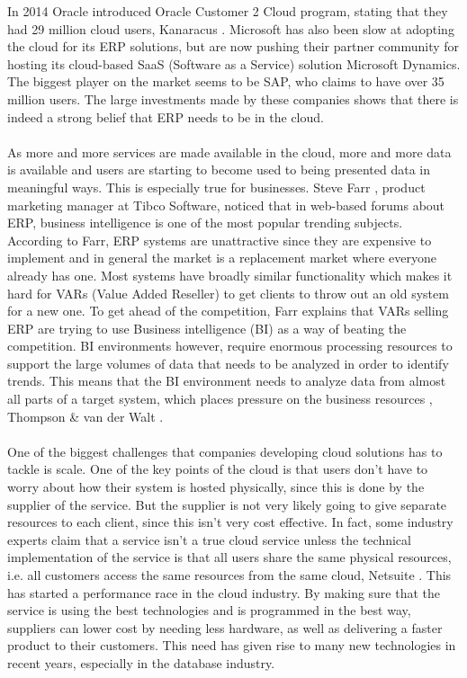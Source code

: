 \documentclass{cslthse-msc}
\begin{document}
In 2014 Oracle introduced Oracle Customer 2 Cloud program, stating that they had 29 million cloud users, Kanaracus \cite{Kanaracus2013}. Microsoft has also been slow at adopting the cloud for its ERP solutions, but are now pushing their partner community for hosting its cloud-based SaaS (Software as a Service) solution Microsoft Dynamics. The biggest player on the market seems to be SAP, who claims to have over 35 million users. The large investments made by these companies shows that there is indeed a strong belief that ERP needs to be in the cloud.\\\\
As more and more services are made available in the cloud, more and more data is available and users are starting to become used to being presented data in meaningful ways. This is especially true for businesses. Steve Farr \cite{RobbOkt14}, product marketing manager at Tibco Software, noticed that in web-based forums about ERP, business intelligence is one of the most popular trending subjects. According to Farr, ERP systems are unattractive since they are expensive to implement and in general the market is a replacement market where everyone already has one. Most systems have broadly similar functionality which makes it hard for VARs (Value Added Reseller) to get clients to throw out an old system for a new one. To get ahead of the competition, Farr explains that VARs selling ERP are trying to use Business intelligence (BI) as a way of beating the competition. BI environments however, require enormous processing resources to support the large volumes of data that needs to be analyzed in order to identify trends. This means that the BI environment needs to analyze data from almost all parts of a target system, which places pressure on the business resources , Thompson \& van der Walt \cite{Thompson10}.\\\\
One of the biggest challenges that companies developing cloud solutions has to tackle is scale. One of the key points of the cloud is that users don't have to worry about how their system is hosted physically, since this is done by the supplier of the service. But the supplier is not very likely going to give separate resources to each client, since this isn't very cost effective. In fact, some industry experts claim that a service isn't a true cloud service unless the technical implementation of the service is that all users share the same physical resources, i.e. all customers access the same resources from the same cloud, Netsuite \cite{Netsuite15}. This has started a performance race in the cloud industry. By making sure that the service is using the best technologies and is programmed in the best way, suppliers can lower cost by needing less hardware, as well as delivering a faster product to their customers. This need has given rise to many new technologies in recent years, especially in the database industry.\\\\
\end{document}
